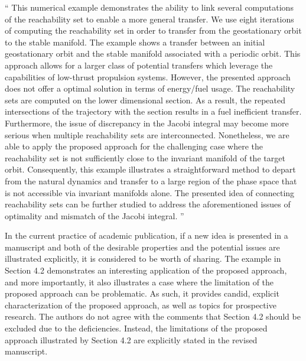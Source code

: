 \documentclass[11pt]{article}
\newenvironment{correction}{\begin{list}{}{\setlength{\leftmargin}{1cm}\setlength{\rightmargin}{1cm}}\vspace{\parsep}\item[]``}{''\end{list}}
\begin{document}
\begin{itemize}
        \begin{correction}
            This numerical example demonstrates the ability to link several computations of the reachability set to enable a more general transfer.
            We use eight iterations of computing the reachability set in order to transfer from the geostationary orbit to the stable manifold.
            The example shows a transfer between an initial geostationary orbit and the stable manifold associated with a periodic orbit. 
            This approach allows for a larger class of potential transfers which leverage the capabilities of low-thrust propulsion systems.
            However, the presented approach does not offer a optimal solution in terms of energy/fuel usage. 
            The reachability sets are computed on the lower dimensional \Poincare section.
            As a result, the repeated intersections of the trajectory with the \Poincare section results in a fuel inefficient transfer.
            Furthermore, the issue of discrepancy in the Jacobi integral may become more serious when multiple reachability sets are interconnected. 
            Nonetheless, we are able to apply the proposed approach for the challenging case where the reachability set is not sufficiently close to the invariant manifold of the target orbit. 
            Consequently, this example illustrates a straightforward method to depart from the natural dynamics and transfer to a large region of the phase space that is not accessible via invariant manifolds alone.
            The presented idea of connecting reachability sets can be further studied to address the aforementioned issues of optimality and mismatch of the Jacobi integral.
        \end{correction}

        In the current practice of academic publication, if a new idea is presented in a manuscript and both of the desirable properties and the potential issues are illustrated explicitly, it is considered to be worth of sharing. 
        The example in Section 4.2 demonstrates an interesting application of the proposed approach, and more importantly, it also illustrates a case where the limitation of the proposed approach can be problematic.
        As such, it provides candid, explicit characterization of the proposed approach, as well as topics for prospective research. 
        The authors do not agree with the comments that Section 4.2 should be excluded due to the deficiencies. 
        Instead, the limitations of the proposed approach illustrated by Section 4.2 are explicitly stated in the revised manuscript.


\end{itemize}
\end{document}
